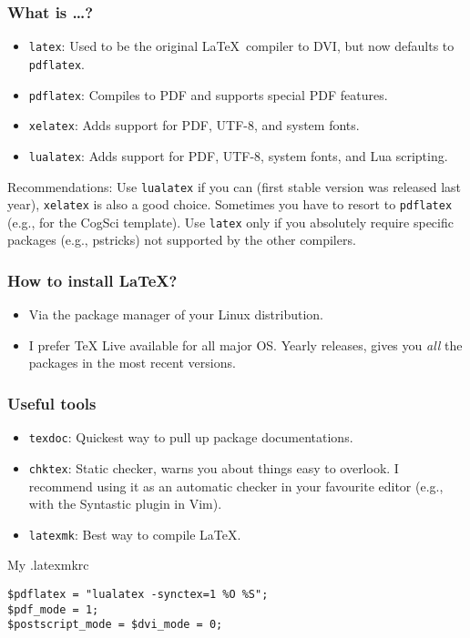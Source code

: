 \documentclass[aspectratio=1610]{beamer}
\begin{document}
\begin{frame}
    \frametitle{What is \dots?}
    \begin{itemize}
        \item \texttt{latex}: Used to be the original \LaTeX\ compiler to DVI\@, but now defaults to \texttt{pdflatex}.
        \item \texttt{pdflatex}: Compiles to PDF and supports special PDF features.
        \item \texttt{xelatex}: Adds support for PDF, UTF-8, and system fonts.
        \item \texttt{lualatex}: Adds support for PDF, UTF-8, system fonts, and Lua scripting.
    \end{itemize}
    Recommendations: Use \texttt{lualatex} if you can (first stable version was released last year), \texttt{xelatex} is also a good choice. Sometimes you have to resort to \texttt{pdflatex} (e.g., for the CogSci template). Use \texttt{latex} only if you absolutely require specific packages (e.g., pstricks) not supported by the other compilers.
\end{frame}
    
\begin{frame}
    \frametitle{How to install \LaTeX?}
    \begin{itemize}
        \item Via the package manager of your Linux distribution.
        \item I prefer TeX Live available for all major OS\@. Yearly releases, gives you \emph{all} the packages in the most recent versions.
    \end{itemize}
\end{frame}

\begin{frame}[fragile]
    \frametitle{Useful tools}
    \begin{itemize}
        \item \texttt{texdoc}: Quickest way to pull up package documentations.
        \item \texttt{chktex}: Static checker, warns you about things easy to overlook. I recommend using it as an automatic checker in your favourite editor (e.g., with the Syntastic plugin in Vim).
        \item \texttt{latexmk}: Best way to compile \LaTeX.
    \end{itemize}
    \begin{beamerboxesrounded}{My .latexmkrc}  %
        \begin{verbatim}
$pdflatex = "lualatex -synctex=1 %O %S";
$pdf_mode = 1;
$postscript_mode = $dvi_mode = 0;
        \end{verbatim}
    \end{beamerboxesrounded}
\end{frame}
\end{document}
